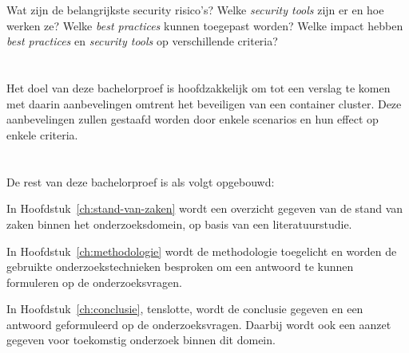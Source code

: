 \section{}
\label{sec:onderzoeksvraag}


Wat zijn de belangrijkste security risico's? Welke \textit{security tools} zijn er en hoe werken ze? Welke \textit{best practices} kunnen toegepast worden? Welke impact hebben \textit{best practices} en \textit{security tools} op verschillende criteria?

\section{}
\label{sec:onderzoeksdoelstelling}


Het doel van deze bachelorproef is hoofdzakkelijk om tot een verslag te komen met daarin aanbevelingen omtrent het beveiligen van een container cluster. Deze aanbevelingen zullen gestaafd worden door enkele scenarios en hun effect op enkele criteria.

\section{}
\label{sec:opzet-bachelorproef}


De rest van deze bachelorproef is als volgt opgebouwd:

In Hoofdstuk~\ref{ch:stand-van-zaken} wordt een overzicht gegeven van de stand van zaken binnen het onderzoeksdomein, op basis van een literatuurstudie.

In Hoofdstuk~\ref{ch:methodologie} wordt de methodologie toegelicht en worden de gebruikte onderzoekstechnieken besproken om een antwoord te kunnen formuleren op de onderzoeksvragen.


In Hoofdstuk~\ref{ch:conclusie}, tenslotte, wordt de conclusie gegeven en een antwoord geformuleerd op de onderzoeksvragen. Daarbij wordt ook een aanzet gegeven voor toekomstig onderzoek binnen dit domein.